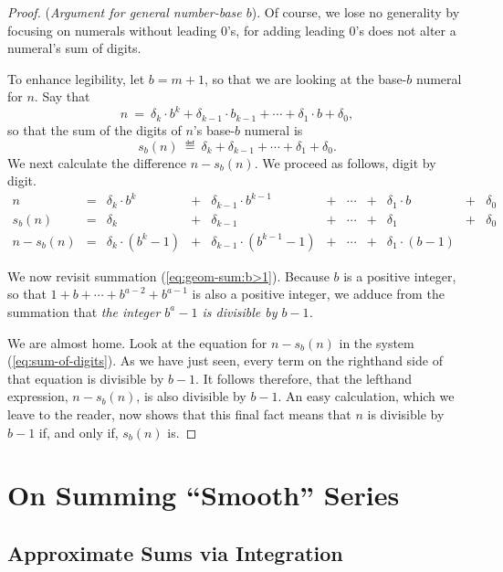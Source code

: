 \begin{proof}
({\it Argument for general number-base $b$}).
%
Of course, we lose no generality by focusing on numerals without
leading $0$'s, for adding leading $0$'s does not alter a numeral's sum
of digits.

To enhance legibility, let $b = m+1$, so that we are looking at the
base-$b$ numeral for $n$.  Say that
\[ n \ = \ \delta_k \cdot b^k + \delta_{k-1} \cdot b_{k-1} + \cdots +
\delta_1 \cdot b + \delta_0, \]
so that the sum of the digits of $n$'s base-$b$ numeral is
\[ s_b(n) \ \eqdef \ \delta_k + \delta_{k-1} + \cdots + \delta_1 + \delta_0. \]
We next calculate the difference $n - s_b(n)$.  We proceed as
follows, digit by digit.
\begin{equation}
\label{eq:sum-of-digits}
\begin{array}{ccccccccccc}
n & = &
\delta_k \cdot b^k & + & \delta_{k-1} \cdot b^{k-1} & + & \cdots
  & + & \delta_1 \cdot b & + & \delta_0 \\
s_b(n) & = &
\delta_k & + & \delta_{k-1} & + & \cdots & + & \delta_1 & + & \delta_0 \\
\hline
n - s_b(n) & = &
\delta_k \cdot (b^k -1) & + &
\delta_{k-1} \cdot (b^{k-1} -1) & + &
\cdots & + &
\delta_1 \cdot (b-1) & & 
\end{array}
\end{equation}

\medskip

We now revisit summation (\ref{eq:geom-sum:b>1}).  Because $b$ is a
positive integer, so that $1 + b + \cdots + b^{a-2} + b^{a-1}$ is also
a positive integer, we adduce from the summation that {\em the integer
  $b^a -1$ is divisible by $b-1$.}

We are almost home.  Look at the equation for $n - s_b(n)$ in the
system (\ref{eq:sum-of-digits}).  As we have just seen, every term on
the righthand side of that equation is divisible by $b-1$.  It follows
therefore, that the lefthand expression, $n - s_b(n)$, is also
divisible by $b-1$.  An easy calculation, which we leave to the
reader, now shows that this final fact means that $n$ is divisible by
$b-1$ if, and only if, $s_b(n)$ is.
\end{proof}


\section{On Summing ``Smooth'' Series}
\label{sec:smooth-series}

\subsection{Approximate Sums via Integration}
\label{sec:riemann-bounds}


